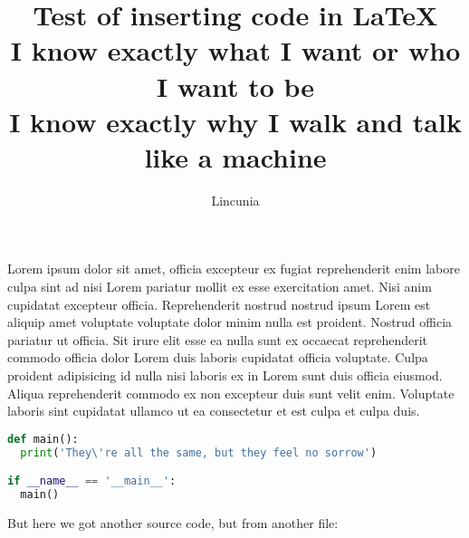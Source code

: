 \documentclass{article}
\begin{document}
\title{%
	Test of inserting code in \LaTeX \\
	\large I know exactly what I want or who I want to be \\
	I know exactly why I walk and talk like a machine}
\author{Lincunia}

\maketitle

Lorem ipsum dolor sit amet, officia excepteur ex fugiat reprehenderit enim
labore culpa sint ad nisi Lorem pariatur mollit ex esse exercitation amet. Nisi
anim cupidatat excepteur officia. Reprehenderit nostrud nostrud ipsum Lorem est
aliquip amet voluptate voluptate dolor minim nulla est proident. Nostrud
officia pariatur ut officia. Sit irure elit esse ea nulla sunt ex occaecat
reprehenderit commodo officia dolor Lorem duis laboris cupidatat officia
voluptate. Culpa proident adipisicing id nulla nisi laboris ex in Lorem sunt
duis officia eiusmod. Aliqua reprehenderit commodo ex non excepteur duis sunt
velit enim. Voluptate laboris sint cupidatat ullamco ut ea consectetur et est
culpa et culpa duis.

\begin{lstlisting}[language=Python]
def main():
  print('They\'re all the same, but they feel no sorrow')

if __name__ == '__main__':
  main()
\end{lstlisting}

\par But here we got another source code, but from another file:

\lstset{escapechar=@,style=customc}

\end{document}
